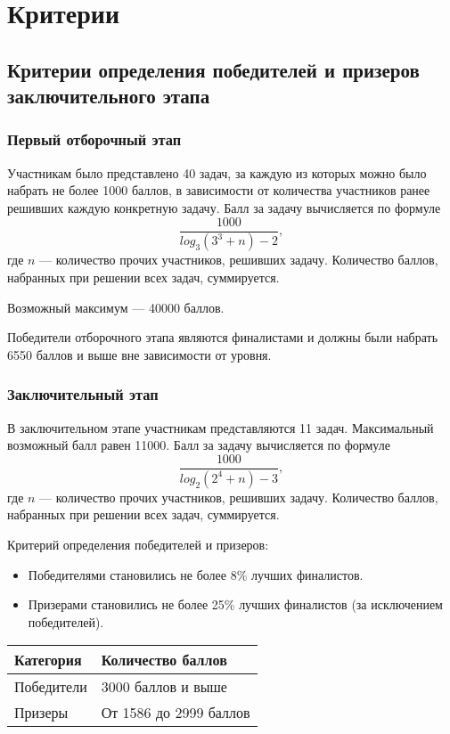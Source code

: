 \part{Критерии}

\chapter{Критерии определения победителей и призеров заключительного этапа}

\section{Первый отборочный этап}

Участникам было представлено 40 задач, за каждую из которых можно было набрать не более 1000 баллов, в зависимости от количества участников ранее решивших каждую конкретную задачу. Балл за задачу вычисляется по формуле $$\frac{1000}{log_3(3^3 + n) - 2},$$ где $n$ — количество прочих участников, решивших задачу. Количество баллов, набранных при решении всех задач, суммируется.

Возможный максимум — 40000 баллов.

Победители отборочного этапа являются финалистами и должны были набрать 6550 баллов и выше вне зависимости от уровня.

\section{Заключительный этап}

В заключительном этапе участникам представляются 11 задач. Максимальный возможный балл равен 11000. Балл за задачу вычисляется по формуле $$\frac{1000}{log_2(2^4 + n) - 3},$$ где $n$ — количество прочих участников, решивших задачу. Количество баллов, набранных при решении всех задач, суммируется.

Критерий определения победителей и призеров:
\begin{itemize} 
    \item Победителями становились не более 8\% лучших финалистов.
    \item Призерами становились не более 25\% лучших финалистов (за исключением победителей).
\end{itemize} 

\begin{center} 
    \begin{tabular}{|l|l|} 
        \hline
        Категория & Количество баллов \\
        \hline
        Победители & 3000 баллов и выше \\
        \hline
        Призеры & От 1586 до 2999 баллов \\
        \hline
    \end{tabular} 
\end{center} 